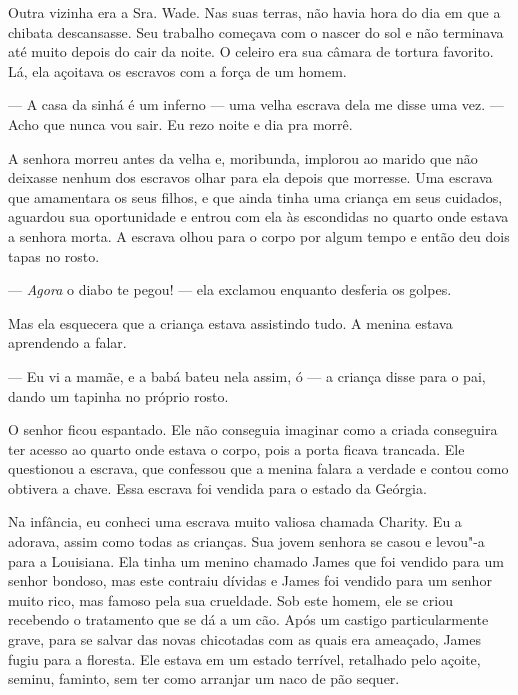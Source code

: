 Outra vizinha era a Sra. Wade. Nas suas
terras, não havia hora do dia em que a chibata descansasse. Seu trabalho
começava com o nascer do sol e não terminava até muito depois do cair da
noite. O celeiro era sua câmara de tortura favorito. Lá, ela açoitava os
escravos com a força de um homem.

--- A casa da sinhá é um inferno --- uma velha escrava dela me disse uma
vez. --- Acho que nunca vou sair. Eu rezo noite e dia pra morrê.

A senhora morreu antes da velha e,
moribunda, implorou ao marido que não deixasse nenhum dos escravos olhar
para ela depois que morresse. Uma escrava que amamentara os seus filhos,
e que ainda tinha uma criança em seus cuidados, aguardou sua
oportunidade e entrou com ela às escondidas no quarto onde estava a
senhora morta. A escrava olhou para o corpo por algum tempo e então deu
dois tapas no rosto.

--- \emph{Agora} o diabo te pegou! --- ela exclamou enquanto desferia os
golpes.

Mas ela esquecera que a criança estava assistindo tudo. A menina estava
aprendendo a falar.

--- Eu vi a mamãe, e a babá bateu nela assim, ó --- a criança disse para
o pai, dando um tapinha no próprio rosto.

O senhor ficou espantado. Ele não conseguia imaginar como a criada
conseguira ter acesso ao quarto onde estava o corpo, pois a porta ficava
trancada. Ele questionou a escrava, que confessou que a menina falara a
verdade e contou como obtivera a chave. Essa escrava foi vendida para o
estado da Geórgia.

Na infância, eu conheci uma escrava
muito valiosa chamada Charity. Eu a adorava, assim como todas as
crianças. Sua jovem senhora se casou e levou"-a para a Louisiana. Ela
tinha um menino chamado James que foi vendido para um senhor bondoso,
mas este contraiu dívidas e James foi vendido para um senhor muito rico,
mas famoso pela sua crueldade. Sob este homem, ele se criou recebendo o
tratamento que se dá a um cão. Após um castigo particularmente grave,
para se salvar das novas chicotadas com as quais era ameaçado, James
fugiu para a floresta. Ele estava em um estado terrível, retalhado pelo
açoite, seminu, faminto, sem ter como arranjar um naco de pão sequer.

